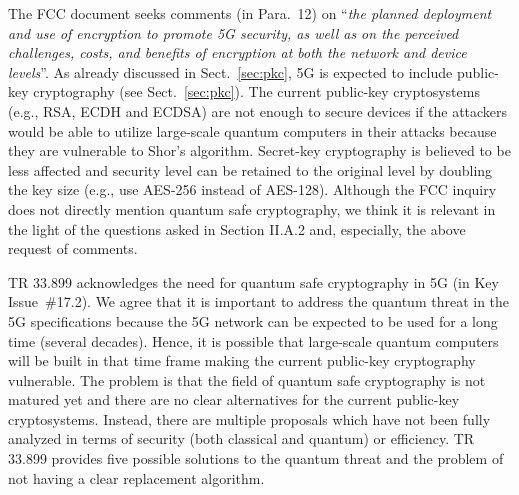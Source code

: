 \documentclass[12pt]{llncs}
\newcommand\ques[1]{``\emph{#1}''}
\begin{document}
The FCC document seeks comments (in Para.~12) on \ques{the planned deployment and use of encryption to promote 5G security, as well as on the perceived challenges, costs, and benefits of encryption at both the network and device levels}. As already discussed in Sect.~\ref{sec:pkc}, 5G is expected to include public-key cryptography (see Sect.~\ref{sec:pkc}). The current public-key cryptosystems (e.g., RSA, ECDH and ECDSA) are not enough to secure devices if the attackers would be able to utilize large-scale quantum computers in their attacks because they are vulnerable to Shor's algorithm. %
Secret-key cryptography is believed to be less affected and security level can be retained to the original level by doubling the key size (e.g., use AES-256 instead of AES-128). Although the FCC inquiry does not directly mention quantum safe cryptography, we think it is relevant in the light of the questions asked in Section II.A.2 and, especially, the above request of comments.

TR 33.899 acknowledges the need for quantum safe cryptography in 5G (in Key Issue~\#17.2). We agree that it is important to address the quantum threat in the 5G specifications because the 5G network can be expected to be used for a long time (several decades). Hence, it is possible that large-scale quantum computers will be built in that time frame making the current public-key cryptography vulnerable. The problem is that the field of quantum safe cryptography is not matured yet and there are no clear alternatives for the current public-key cryptosystems. Instead, there are multiple proposals which have not been fully analyzed in terms of security (both classical and quantum) or efficiency. TR 33.899 provides five possible solutions to the quantum threat and the problem of not having a clear replacement algorithm.
\end{document}
